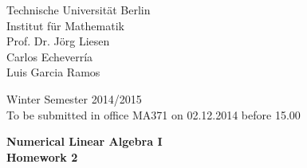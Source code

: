 \documentclass[10pt]{report}
\begin{document}
\begin{minipage}[t]{0.58\textwidth}
Technische Universit\"at Berlin\\
Institut f\"ur Mathematik\\
Prof. Dr. J\"org Liesen\\
Carlos Echeverr\'ia\\
Luis Garcia Ramos
\end{minipage}
\hfill
\begin{minipage}[t]{0.48\textwidth}
\begin{flushright}
Winter Semester 2014/2015\\
To be submitted in office MA371 on 02.12.2014 before 15.00
\end{flushright}
\end{minipage}
\begin{center}
\textbf{{Numerical Linear Algebra I}}\\
\textbf{Homework 2}
\end{center}

\thispagestyle{empty}
\end{document}
